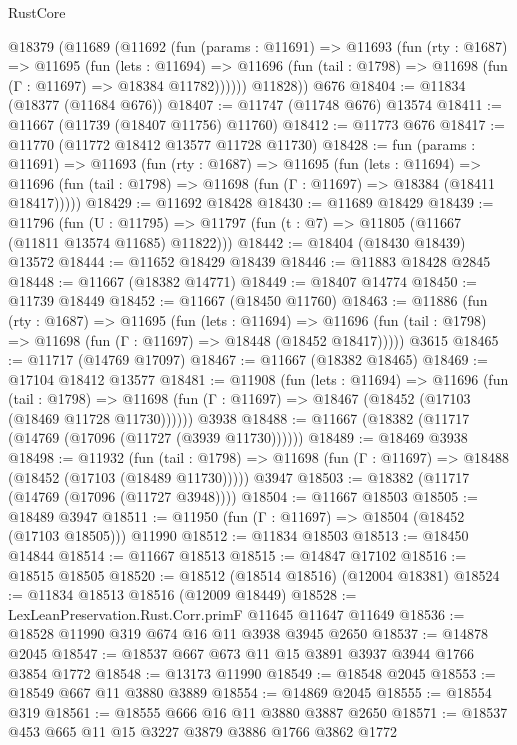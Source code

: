 \begin{lexlean}{RustCore}
\begin{coremodule}
    @18379
      (@11689
        (@11692
          (fun (params : @11691) =>
          @11693
            (fun (rty : @1687) =>
            @11695
              (fun (lets : @11694) =>
              @11696 (fun (tail : @1798) => @11698 (fun (Γ : @11697) => @18384 @11782))))))
        @11828))
    @676
@18404 := @11834 (@18377 (@11684 @676))
@18407 := @11747 (@11748 @676) @13574
@18411 := @11667 (@11739 (@18407 @11756) @11760)
@18412 := @11773 @676
@18417 := @11770 (@11772 @18412 @13577 @11728 @11730)
@18428 := fun (params : @11691) =>
  @11693
    (fun (rty : @1687) =>
    @11695
      (fun (lets : @11694) =>
      @11696 (fun (tail : @1798) => @11698 (fun (Γ : @11697) => @18384 (@18411 @18417)))))
@18429 := @11692 @18428
@18430 := @11689 @18429
@18439 := @11796
    (fun (U : @11795) => @11797 (fun (t : @7) => @11805 (@11667 (@11811 @13574 @11685) @11822)))
@18442 := @18404 (@18430 @18439) @13572
@18444 := @11652 @18429 @18439
@18446 := @11883 @18428 @2845
@18448 := @11667 (@18382 @14771)
@18449 := @18407 @14774
@18450 := @11739 @18449
@18452 := @11667 (@18450 @11760)
@18463 := @11886
    (fun (rty : @1687) =>
    @11695
      (fun (lets : @11694) =>
      @11696 (fun (tail : @1798) => @11698 (fun (Γ : @11697) => @18448 (@18452 @18417)))))
    @3615
@18465 := @11717 (@14769 @17097)
@18467 := @11667 (@18382 @18465)
@18469 := @17104 @18412 @13577
@18481 := @11908
    (fun (lets : @11694) =>
    @11696
      (fun (tail : @1798) =>
      @11698 (fun (Γ : @11697) => @18467 (@18452 (@17103 (@18469 @11728 @11730))))))
    @3938
@18488 := @11667 (@18382 (@11717 (@14769 (@17096 (@11727 (@3939 @11730))))))
@18489 := @18469 @3938
@18498 := @11932
    (fun (tail : @1798) => @11698 (fun (Γ : @11697) => @18488 (@18452 (@17103 (@18489 @11730)))))
    @3947
@18503 := @18382 (@11717 (@14769 (@17096 (@11727 @3948))))
@18504 := @11667 @18503
@18505 := @18489 @3947
@18511 := @11950 (fun (Γ : @11697) => @18504 (@18452 (@17103 @18505))) @11990
@18512 := @11834 @18503
@18513 := @18450 @14844
@18514 := @11667 @18513
@18515 := @14847 @17102
@18516 := @18515 @18505
@18520 := @18512 (@18514 @18516) (@12004 @18381)
@18524 := @11834 @18513 @18516 (@12009 @18449)
@18528 := LexLeanPreservation.Rust.Corr.primF @11645 @11647 @11649
@18536 := @18528 @11990 @319 @674 @16 @11 @3938 @3945 @2650
@18537 := @14878 @2045
@18547 := @18537 @667 @673 @11 @15 @3891 @3937 @3944 @1766 @3854 @1772
@18548 := @13173 @11990
@18549 := @18548 @2045
@18553 := @18549 @667 @11 @3880 @3889
@18554 := @14869 @2045
@18555 := @18554 @319
@18561 := @18555 @666 @16 @11 @3880 @3887 @2650
@18571 := @18537 @453 @665 @11 @15 @3227 @3879 @3886 @1766 @3862 @1772

\end{coremodule}
\end{lexlean}
